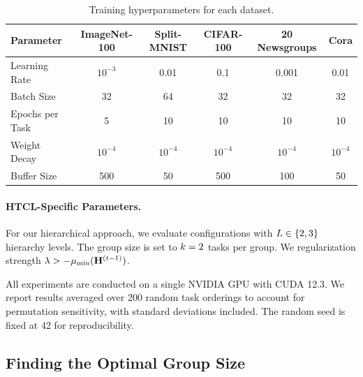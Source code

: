 \begin{table}[ht]
\centering
\caption{Training hyperparameters for each dataset.}
\label{tab:hyperparams}
\begin{tabular}{lccccc}
\toprule
\textbf{Parameter} & \textbf{ImageNet-100} & \textbf{Split-MNIST} & \textbf{CIFAR-100} & \textbf{20 Newsgroups} & \textbf{Cora} \\
\midrule
Learning Rate      & $10^{-3}$ & 0.01      & 0.1       & 0.001     & 0.01  \\
Batch Size         & 32       & 64        & 32        & 32        & 32    \\
Epochs per Task    & 5         & 10        & 10        & 10        & 10    \\
Weight Decay       & $10^{-4}$ & $10^{-4}$ & $10^{-4}$ & $10^{-4}$ & $10^{-4}$ \\
Buffer Size        & 500      & 50        & 500       & 100       & 50    \\
\bottomrule
\end{tabular}
\end{table}

\paragraph{HTCL-Specific Parameters.}
For our hierarchical approach, we evaluate configurations with $L \in \{2, 3\}$ hierarchy levels. The group size is set to $k=2$ tasks per group. We regularization strength $\lambda > -\mu_{\min}(\mathbf{H}^{(t-1)})$. 

All experiments are conducted on a single NVIDIA GPU with CUDA 12.3. We report results averaged over 200 random task orderings to account for permutation sensitivity, with standard deviations included. The random seed is fixed at 42 for reproducibility.

\subsection{Finding the Optimal Group Size}
\label{app:break-even-point}

